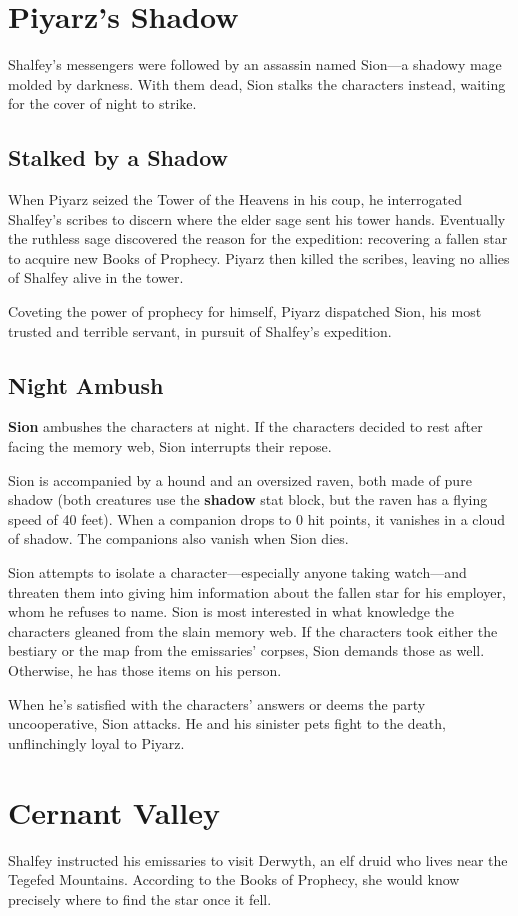 \documentclass[10pt,a4paper,twoside,bg=print,twocolumn,openany,nodeprecatedcode]{dndbook}
\begin{document}
\section{Piyarz's Shadow}
Shalfey's messengers were followed by an assassin named Sion—a shadowy mage molded by darkness. With them dead, Sion stalks the characters instead, waiting for the cover of night to strike.

\subsection{Stalked by a Shadow}
When Piyarz seized the Tower of the Heavens in his coup, he interrogated Shalfey's scribes to discern where the elder sage sent his tower hands. Eventually the ruthless sage discovered the reason for the expedition: recovering a fallen star to acquire new Books of Prophecy. Piyarz then killed the scribes, leaving no allies of Shalfey alive in the tower.

Coveting the power of prophecy for himself, Piyarz dispatched Sion, his most trusted and terrible servant, in pursuit of Shalfey's expedition.

\subsection{Night Ambush}
\textbf{Sion} ambushes the characters at night. If the characters decided to rest after facing the memory web, Sion interrupts their repose.

Sion is accompanied by a hound and an oversized raven, both made of pure shadow (both creatures use the \textbf{shadow} stat block, but the raven has a flying speed of 40 feet). When a companion drops to 0 hit points, it vanishes in a cloud of shadow. The companions also vanish when Sion dies.

Sion attempts to isolate a character—especially anyone taking watch—and threaten them into giving him information about the fallen star for his employer, whom he refuses to name. Sion is most interested in what knowledge the characters gleaned from the slain memory web. If the characters took either the bestiary or the map from the emissaries' corpses, Sion demands those as well. Otherwise, he has those items on his person.

When he's satisfied with the characters' answers or deems the party uncooperative, Sion attacks. He and his sinister pets fight to the death, unflinchingly loyal to Piyarz.

\section{Cernant Valley}
Shalfey instructed his emissaries to visit Derwyth, an elf druid who lives near the Tegefed Mountains. According to the Books of Prophecy, she would know precisely where to find the star once it fell.
\end{document}
